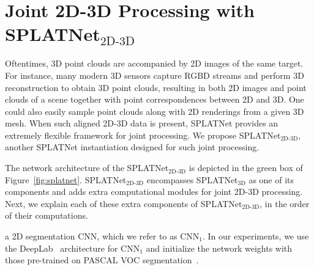 \documentclass[10pt,twocolumn,letterpaper]{article}
\begin{document}
\section{Joint 2D-3D Processing with SPLATNet$_{\text{2D-3D}}$}\label{sec:bpcn_2d3d}

Oftentimes, 3D point clouds are accompanied by 2D images of the same target. For instance, many modern 3D
sensors capture RGBD streams and perform 3D reconstruction to obtain 3D point clouds, resulting
in both 2D images and point clouds of a scene together with point correspondences between 2D and 3D.
One could also easily sample point clouds along with 2D renderings from a given 3D mesh.
When such aligned 2D-3D data is present, SPLATNet provides an extremely flexible framework for joint 
processing. We propose SPLATNet$_{\text{2D-3D}}$, another SPLATNet instantiation designed for such joint
processing.

The network architecture of the SPLATNet$_{\text{2D-3D}}$ is depicted in the green box of Figure~\ref{fig:splatnet}.
SPLATNet$_{\text{2D-3D}}$ encompasses SPLATNet$_{\text{3D}}$ as one of its components and adds extra computational 
modules for joint 2D-3D processing. Next, we explain each of these extra components of SPLATNet$_{\text{2D-3D}}$,
in the order of their computations.

a 2D segmentation CNN, which we refer to as CNN$_1$.
In our experiments, we use the DeepLab~\cite{chen2014semantic} architecture
for CNN$_1$ and initialize the network weights with those pre-trained on
PASCAL VOC segmentation~\cite{Everingham15}.
\end{document}
